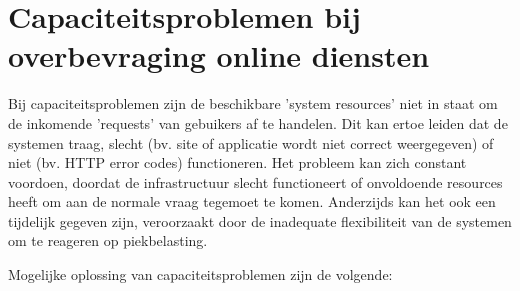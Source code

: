 
\section{Capaciteitsproblemen bij overbevraging online diensten}

Bij capaciteitsproblemen zijn de beschikbare 'system resources'
niet in staat om de inkomende 'requests' van gebuikers af te handelen.
Dit kan ertoe leiden dat de systemen traag, slecht (bv. site of applicatie wordt niet correct
weergegeven) of niet (bv. HTTP error codes) functioneren.
Het probleem kan zich constant voordoen, doordat de infrastructuur slecht
functioneert of onvoldoende resources heeft om aan de normale
vraag tegemoet te komen. Anderzijds kan het ook een tijdelijk gegeven zijn,
veroorzaakt door de inadequate flexibiliteit van de systemen om
te reageren op piekbelasting. \newline

Mogelijke oplossing van capaciteitsproblemen zijn de volgende:

